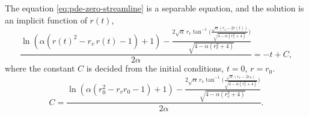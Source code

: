 The equation \eqref{eq:pde-zero-streamline} is a separable equation, and the solution is an implicit function of $r(t)$,
\begin{equation}
    \frac{\ln(\alpha(r(t)^2-r_v\,r(t)-1)+1) - \frac{2\sqrt{\alpha}\,r_v \tan^{-1}\bigg(\frac{\sqrt{\alpha} (r_v-2r(t))}{\sqrt{4-\alpha(r_v^2+4)}}\bigg)}{\sqrt{4-\alpha(r_v^2+4)}}}{2\alpha}=-t+C,
    \label{eq:streamline-solution}
\end{equation}
where the constant $C$ is decided from the initial conditions, $t=0$, $r=r_0$.
\begin{equation}
    C=\frac{\ln(\alpha(r_0^2-r_v r_0-1)+1) - \frac{2\sqrt{\alpha}\,r_v \tan^{-1}\bigg(\frac{\sqrt{\alpha} (r_v-2r_0)}{\sqrt{4-\alpha(r_v^2+4)}}\bigg)}{\sqrt{4-\alpha(r_v^2+4)}}}{2\alpha}.
    \label{eq:streamline-solution-constant}
\end{equation}

